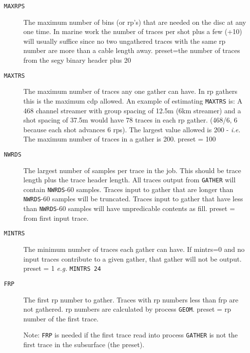 \begin{description}
\item[\texttt{MAXRPS}] The maximum number of bins (or \gls{rp}'s) that are needed on the
         disc at any one time.  In marine work the number of traces per
         \gls{shot} plus a few (+10) will usually suffice since no two
         ungathered traces with the same \gls{rp} number are more than a cable
         length away.
         \Gls{preset}=the number of traces from the segy binary header plus 20

\item[\texttt{MAXTRS}] The maximum number of traces any one \gls{gather} can have.   In \gls{rp}
         \glspl{gather} this is the maximum cdp allowed.  An example of
         estimating \texttt{MAXTRS} is:  A 468 channel streamer with group spacing
         of 12.5m (6km streamer) and a \gls{shot} spacing of 37.5m would have
         78 traces in each \gls{rp} \gls{gather}. (468/6, 6 because each \gls{shot}
         advances 6 \glspl{rp}).  The largest value allowed is 200 -
         \textit{i.e.} The maximum number of traces in a \gls{gather} is 200.
         \Gls{preset} = 100

\item[\texttt{NWRDS}] The largest number of samples per trace in the job.  This
         should be trace length plus the trace header length.  All
         traces output from \texttt{GATHER} will contain \texttt{NWRDS}-60 samples.
         Traces input to gather that are longer than \texttt{NWRDS}-60 samples
         will be truncated.  Traces input to gather that have less
         than \texttt{NWRDS}-60 samples will have unpredicable contents as fill.
         \Gls{preset} = from first input trace.

\item[\texttt{MINTRS}] The minimum number of traces each \gls{gather} can have.  If mintrs=0
         and no input traces contribute to a given \gls{gather}, that \gls{gather}
         will not be output.
         \Gls{preset} = 1  \textit{e.g.} \texttt{MINTRS 24}

\item[\texttt{FRP}] The first \gls{rp} number to gather.  Traces with \gls{rp} numbers less
         than frp are not gathered. \gls{rp} numbers are calculated by process \texttt{GEOM}.
         \Gls{preset} = \gls{rp} number of the first trace.

         Note: \texttt{FRP} is needed if the first trace read into process \texttt{GATHER} is
         not the first trace in the subsurface (the preset).


\end{description}
